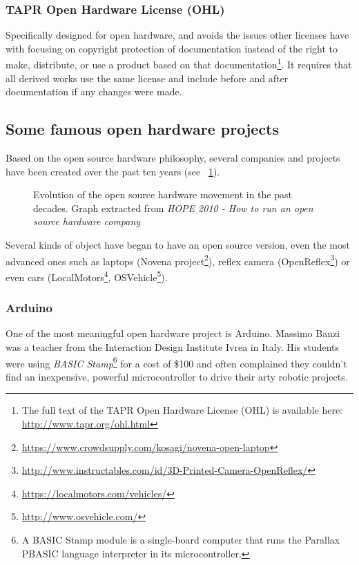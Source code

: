 \subsubsection{TAPR Open Hardware License (OHL)}
Specifically designed for open hardware, and avoids the issues other licenses have with focusing on copyright protection of documentation instead of the right to make, distribute, or use a product based on that documentation\footnote{The full text of the TAPR Open Hardware License (OHL) is available here: \url{http://www.tapr.org/ohl.html}}. It requires that all derived works use the same license and include before and after documentation if any changes were made.

\subsection{Some famous open hardware projects} %

Based on the open source hardware philosophy, several companies and projects have been created over the past ten years (see \figurename~\ref{fig:oh_evolution}).

\begin{figure}[tb]
\centering
    \hfil
    \caption{Evolution of the open source hardware movement in the past decades. Graph extracted from \emph{HOPE 2010 - How to run an open source hardware company}}
    \label{fig:oh_evolution}
\end{figure}


Several kinds of object have began to have an open source version, even the most advanced ones such as laptops (Novena project\footnote{\url{https://www.crowdsupply.com/kosagi/novena-open-laptop}}), reflex camera (OpenReflex\footnote{\url{http://www.instructables.com/id/3D-Printed-Camera-OpenReflex/}}) or even cars (LocalMotors\footnote{\url{https://localmotors.com/vehicles/}}, OSVehicle\footnote{\url{http://www.osvehicle.com/}}).


\subsubsection{Arduino} %
\label{sec:arduino-review}
One of the most meaningful open hardware project is Arduino. Massimo Banzi was a teacher from the Interaction Design Institute Ivrea in Italy. His students were using \emph{BASIC Stamp}\footnote{A BASIC Stamp module is a single-board computer that runs the Parallax PBASIC language interpreter in its microcontroller.} for a cost of \$100 and often complained they couldn't find an inexpensive, powerful microcontroller to drive their arty robotic projects.


